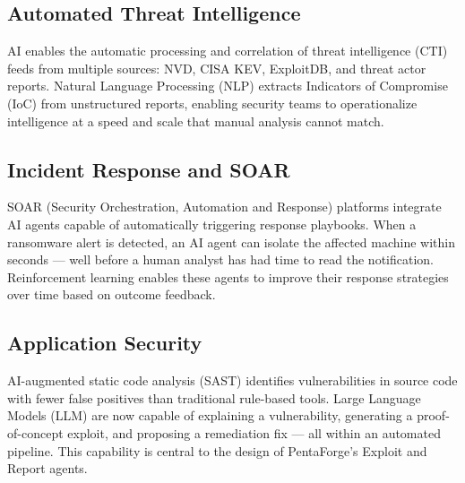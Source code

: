\documentclass[12pt,a4paper]{report}
\begin{document}
\subsection{Automated Threat Intelligence}

AI enables the automatic processing and correlation of threat intelligence (CTI)
feeds from multiple sources: NVD, CISA KEV, ExploitDB, and threat actor reports.
Natural Language Processing (NLP) extracts Indicators of Compromise (IoC) from
unstructured reports, enabling security teams to operationalize intelligence at
a speed and scale that manual analysis cannot match.

\subsection{Incident Response and SOAR}

SOAR (Security Orchestration, Automation and Response) platforms integrate AI
agents capable of automatically triggering response playbooks. When a ransomware
alert is detected, an AI agent can isolate the affected machine within seconds ---
well before a human analyst has had time to read the notification. Reinforcement
learning enables these agents to improve their response strategies over time based
on outcome feedback.

\subsection{Application Security}

AI-augmented static code analysis (SAST) identifies vulnerabilities in source code
with fewer false positives than traditional rule-based tools. Large Language Models
(LLM) are now capable of explaining a vulnerability, generating a proof-of-concept
exploit, and proposing a remediation fix --- all within an automated pipeline. This
capability is central to the design of PentaForge's Exploit and Report agents.
\end{document}

